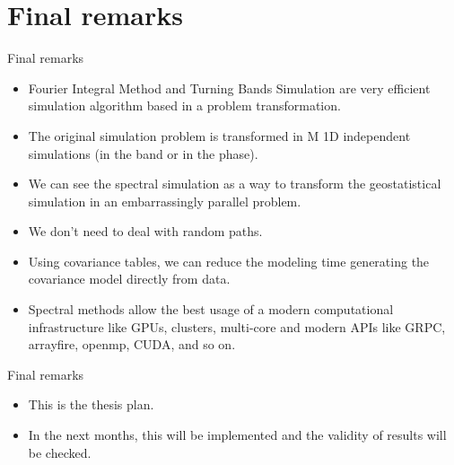 \section{Final remarks}
\begin{frame}{Final remarks}
\begin{itemize}
	\item Fourier Integral Method and Turning Bands Simulation are very efficient simulation algorithm based in a problem transformation.
    \item The original simulation problem is transformed in M 1D independent simulations (in the band or in the phase).
    \item We can see the spectral simulation as a way to transform the geostatistical simulation in an embarrassingly parallel problem. 
    \item We don't need to deal with random paths.
    \item Using covariance tables, we can reduce the modeling time generating the covariance model directly from data.
    \item Spectral methods allow the best usage of a modern computational infrastructure like GPUs, clusters, multi-core and modern APIs like GRPC, arrayfire, openmp, CUDA, and so on.
\end{itemize}
\end{frame}


\begin{frame}{Final remarks}
\begin{itemize}
	\item This is the thesis plan.
    \item In the next months, this will be implemented and the validity of results will be checked. 
\end{itemize}
\end{frame}




